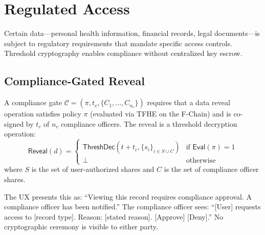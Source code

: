 

\section{Regulated Access}
\label{sec:regulated}

Certain data---personal health information, financial records, legal
documents---is subject to regulatory requirements that mandate specific
access controls. Threshold cryptography enables compliance without
centralized key escrow.

\subsection{Compliance-Gated Reveal}

\begin{definition}
A compliance gate $\mathcal{C} = (\pi, t_c, \{C_1, \ldots, C_{n_c}\})$
requires that a data reveal operation satisfies policy $\pi$ (evaluated
via TFHE on the F-Chain) and is co-signed by $t_c$ of $n_c$ compliance
officers. The reveal is a threshold decryption operation:
\begin{equation}
    \mathsf{Reveal}(d) = \begin{cases}
    \mathsf{ThreshDec}(t + t_c, \{s_i\}_{i \in S \cup C}) & \text{if } \mathsf{Eval}(\pi) = 1 \\
    \perp & \text{otherwise}
    \end{cases}
\end{equation}
where $S$ is the set of user-authorized shares and $C$ is the set of
compliance officer shares.
\end{definition}

The UX presents this as: ``Viewing this record requires compliance
approval. A compliance officer has been notified.'' The compliance
officer sees: ``[User] requests access to [record type]. Reason:
[stated reason]. [Approve] [Deny].'' No cryptographic ceremony is
visible to either party.

